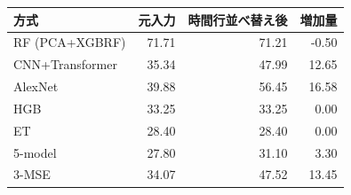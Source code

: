 \begin{tabular}{lrrr}
\toprule
方式 & 元入力 & 時間行並べ替え後 & 増加量 \\
\midrule
RF (PCA+XGBRF) & 71.71 & 71.21 & -0.50 \\
CNN+Transformer & 35.34 & 47.99 & 12.65 \\
AlexNet & 39.88 & 56.45 & 16.58 \\
HGB & 33.25 & 33.25 & 0.00 \\
ET & 28.40 & 28.40 & 0.00 \\
5-model & 27.80 & 31.10 & 3.30 \\
3-MSE & 34.07 & 47.52 & 13.45 \\
\bottomrule
\end{tabular}
